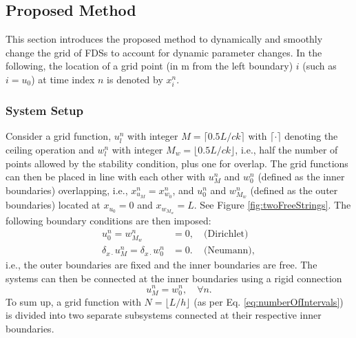 \subsection{Proposed Method}\label{sec:proposedMethod}
This section introduces the proposed method to dynamically and smoothly change the grid of FDSs to account for dynamic parameter changes. %
In the following, the location of a grid point (in m from the left boundary) $i$ (such as $i = u_0$) at time index $n$ is denoted by $x_i^n$. 

\subsubsection{System Setup}\label{sec:systSetup}
Consider a grid function, $u_l^n$ with integer $M = \lceil 0.5L/ck\rceil $ with $\lceil \cdot \rceil$ denoting the ceiling operation and $w_l^n$ with integer $M_w = \lfloor 0.5L/ck\rfloor$, i.e., half the number of points allowed by the stability condition, plus one for overlap. The grid functions can then be placed in line with each other with $u_M^n$ and $w_0^n$ (defined as the inner boundaries) overlapping, i.e., $x_{u_M}^n = x_{w_0}^n$, and $u_0^n$ and $w_{M_w}^n$ (defined as the outer boundaries) located at $x_{u_0} = 0$ and $x_{w_{M_w}} = L$. See Figure \ref{fig:twoFreeStrings}. The following boundary conditions are then imposed:
\begin{subequations}\label{eq:halfStringBoundaryCond}
    \begin{align}
        u_0^n = w_{M_w}^n &= 0,\quad \text{(Dirichlet)}\label{eq:halfStringBoundaryCondDirichlet}\\
        \delta_{x\cdot}u_M^n = \delta_{x\cdot}w_0^n &= 0.\, \quad\text{(Neumann)}, \label{eq:halfStringBoundaryCondNeumann}
    \end{align}
\end{subequations}
i.e., the outer boundaries are fixed and the inner boundaries are free.
%
%
The systems can then be connected at the inner boundaries using a rigid connection
\begin{equation}\label{eq:rigid}
    u_M^n = w_0^n,\quad \forall n.
\end{equation}
To sum up, a grid function with $N = \lfloor L/h\rfloor$ (as per Eq. \eqref{eq:numberOfIntervals}) is divided into two separate subsystems connected at their respective inner boundaries. 

